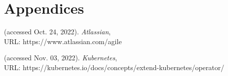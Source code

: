 \documentclass{article}
\begin{document}
\section{Appendices}





\clearpage
\begin{thebibliography}{9}


(accessed Oct. 24, 2022). 
\emph{Atlassian}, \\URL: https://www.atlassian.com/agile 

(accessed Nov. 03, 2022).
\emph{Kubernetes}, \\URL: https://kubernetes.io/docs/concepts/extend-kubernetes/operator/
\end{thebibliography}
\end{document}
